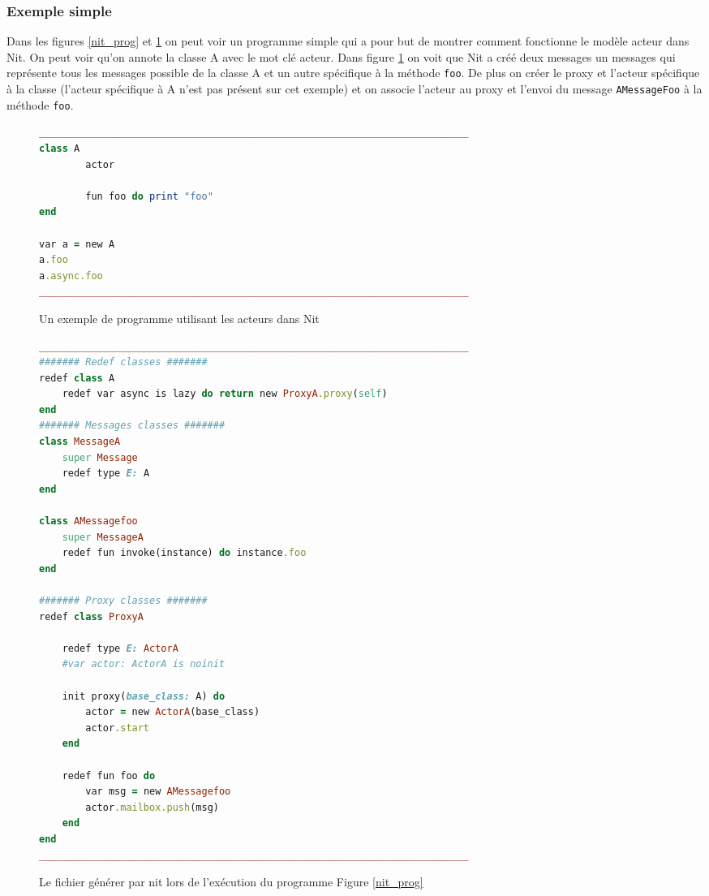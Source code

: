 \documentclass[11pt, a4paper]{article}
\begin{document}
\subsubsection{Exemple simple}

Dans les figures \ref{nit_prog} et \ref{nit_prog_gen} on peut voir un programme simple qui a pour but de montrer comment fonctionne le modèle acteur dans Nit. On peut voir qu'on annote la classe A avec le mot clé acteur. Dans figure \ref{nit_prog_gen} on voit que Nit a créé deux messages un messages qui représente tous les messages possible de la classe A et un autre spécifique à la méthode \texttt{foo}. De plus on créer le proxy et l'acteur spécifique à la classe (l'acteur spécifique à A n'est pas présent sur cet exemple) et on associe l'acteur au proxy et l'envoi du message \texttt{AMessageFoo} à la méthode \texttt{foo}.

\begin{figure}
\centering
\begin{minipage}{.5\textwidth}
  \centering
  \begin{lstlisting}[language=ruby]
__________________________________________________________________________
class A 
        actor

        fun foo do print "foo"
end

var a = new A
a.foo
a.async.foo
__________________________________________________________________________
\end{lstlisting}
  \caption{Un exemple de programme utilisant les acteurs dans Nit}
  \label{nit_prog}
\end{minipage}%
\begin{minipage}{.5\textwidth}
  \centering
\begin{lstlisting}[language=ruby]
__________________________________________________________________________
####### Redef classes #######
redef class A
	redef var async is lazy do return new ProxyA.proxy(self)
end
####### Messages classes #######
class MessageA
	super Message
	redef type E: A
end

class AMessagefoo
	super MessageA
	redef fun invoke(instance) do instance.foo
end

####### Proxy classes #######
redef class ProxyA

	redef type E: ActorA
	#var actor: ActorA is noinit

	init proxy(base_class: A) do
		actor = new ActorA(base_class)
		actor.start
	end

	redef fun foo do
		var msg = new AMessagefoo
		actor.mailbox.push(msg)
	end
end
__________________________________________________________________________
\end{lstlisting} 
\caption{Le fichier générer par nit lors de l'exécution du programme Figure \ref{nit_prog}}
  \label{nit_prog_gen}
\end{minipage}
\end{figure}
\end{document}
